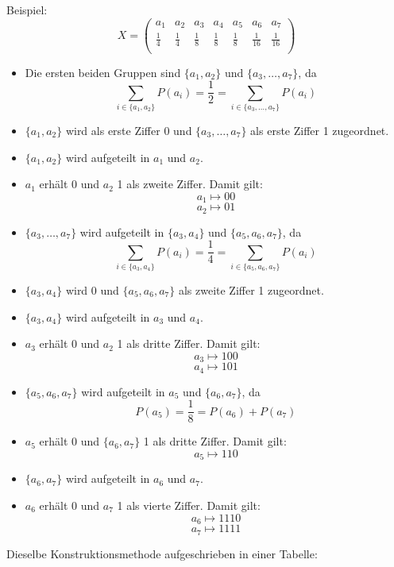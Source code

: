 Beispiel: 
$$
X = 
\left(
\begin{array}{*{7}{c}}
	a_1         & a_2         & a_3         & a_4         & a_5         & a_6          & a_7          \\
	\frac{1}{4} & \frac{1}{4} & \frac{1}{8} & \frac{1}{8} & \frac{1}{8} & \frac{1}{16} & \frac{1}{16} \\
\end{array}
\right)
$$
\begin{itemize}
  \item Die ersten beiden Gruppen sind $\{a_1, a_2\}$ und $\{a_3, \ldots, a_7\}$, da 
	$$ \sum_{i \in \{a_1, a_2\}}P(a_i) = \frac{1}{2} = \sum_{i \in \{a_3, \ldots, a_7\}} P(a_i) $$
  \item $\{a_1, a_2\}$ wird als erste Ziffer 0 und $\{a_3, \ldots, a_7\}$ als erste Ziffer 1 zugeordnet.
  \item $\{a_1, a_2\}$ wird aufgeteilt in $a_1$ und $a_2$. 
  \item $a_1$ erhält 0 und $a_2$ 1 als zweite Ziffer. Damit gilt:
	$$ a_1 \mapsto 00 $$
	$$ a_2 \mapsto 01 $$
  \item $\{a_3, \ldots, a_7\}$ wird aufgeteilt in $\{a_3, a_4\}$ und $\{a_5, a_6, a_7\}$, da
  $$ \sum_{i \in \{a_3, a_4\}}P(a_i) = \frac{1}{4} = \sum_{i \in \{a_5, a_6, a_7\}} P(a_i) $$
  \item $\{a_3, a_4\}$ wird 0 und $\{a_5, a_6, a_7\}$ als zweite Ziffer 1 zugeordnet.
  \item $\{a_3, a_4\}$ wird aufgeteilt in $a_3$ und $a_4$.
  \item $a_3$ erhält 0 und $a_2$ 1 als dritte Ziffer. Damit gilt:
	$$ a_3 \mapsto 100 $$
	$$ a_4 \mapsto 101 $$
  \item $\{a_5, a_6, a_7\}$ wird aufgeteilt in $a_5$ und $\{a_6, a_7\}$, da
  $$ P(a_5) = \frac{1}{8} = P(a_6) + P(a_7) $$
  \item $a_5$ erhält 0 und $\{a_6, a_7\}$ 1 als dritte Ziffer. Damit gilt:
	$$ a_5 \mapsto 110 $$
  \item $\{a_6, a_7\}$ wird aufgeteilt in $a_6$ und $a_7$.
  \item $a_6$ erhält 0 und $a_7$ 1 als vierte Ziffer. Damit gilt:
	$$ a_6 \mapsto 1110 $$
	$$ a_7 \mapsto 1111 $$
\end{itemize}

Dieselbe Konstruktionsmethode aufgeschrieben in einer Tabelle:

